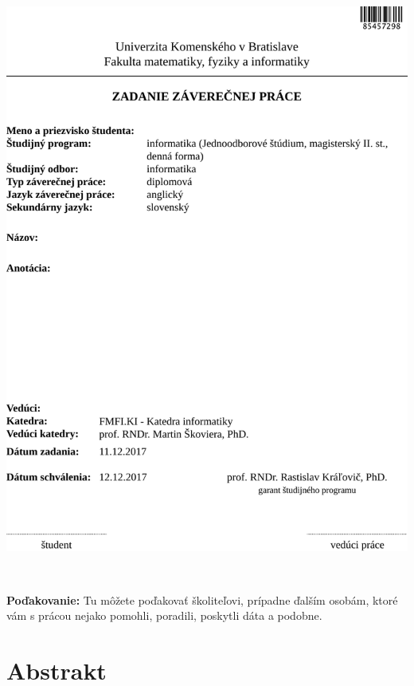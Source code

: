 \documentclass[12pt, twoside]{book}
\begin{document}
\newpage 
\thispagestyle{empty}
\hspace{-2cm}\includegraphics[width=1.1\textwidth]{images/zadanie}


\frontmatter

\setcounter{page}{3}
\newpage 
~

\vfill
{\bf Poďakovanie:} Tu môžete poďakovať školiteľovi, prípadne
ďalším osobám, ktoré vám s prácou nejako pomohli, poradili,
poskytli dáta a podobne.


\newpage 
\section*{Abstrakt}
\end{document}
